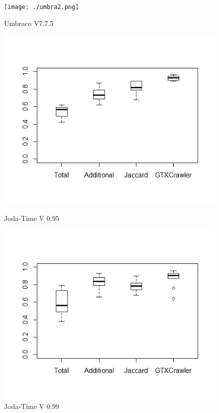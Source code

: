 \begin{figure}[!hb]
	\texttt{[image: ./umbra2.png]}
	\caption*{Umbraco V7.7.5}
	\label{fig:umbra2}
	\endminipage\hfill
	\includegraphics[width=0.95\linewidth]{./joda1.png}
	\caption*{Joda-Time V 0.95}
	\label{fig:joda1}
	\endminipage\hfill	
	\includegraphics[width=0.95\linewidth]{./joda2.png}
	\caption*{Joda-Time V 0.99}
	\label{fig:joda2}
	\endminipage\hfill	
\end{figure}

